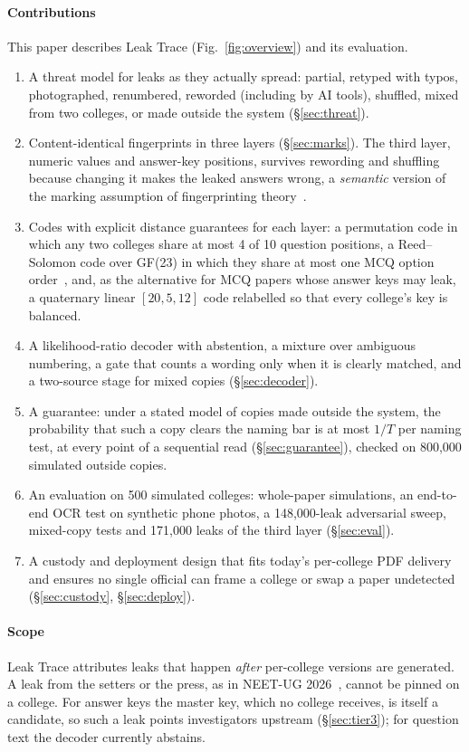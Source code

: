\documentclass[10pt,a4paper]{article}
\theoremstyle{remark}
\begin{document}
\paragraph{Contributions} This paper describes Leak Trace (Fig.~\ref{fig:overview}) and its evaluation.
\begin{enumerate}[label=(\arabic*)]
\item A threat model for leaks as they actually spread: partial, retyped with typos, photographed, renumbered, reworded (including by AI tools), shuffled, mixed from two colleges, or made outside the system (\S\ref{sec:threat}).
\item Content-identical fingerprints in three layers (\S\ref{sec:marks}). The third layer, numeric values and answer-key positions, survives rewording and shuffling because changing it makes the leaked answers wrong, a \emph{semantic} version of the marking assumption of fingerprinting theory~\citep{boneh1998}.
\item Codes with explicit distance guarantees for each layer: a permutation code in which any two colleges share at most 4 of 10 question positions, a Reed--Solomon code over GF(23) in which they share at most one MCQ option order~\citep{reed1960}, and, as the alternative for MCQ papers whose answer keys may leak, a quaternary linear $[20,5,12]$ code relabelled so that every college's key is balanced.
\item A likelihood-ratio decoder with abstention, a mixture over ambiguous numbering, a gate that counts a wording only when it is clearly matched, and a two-source stage for mixed copies (\S\ref{sec:decoder}).
\item A guarantee: under a stated model of copies made outside the system, the probability that such a copy clears the naming bar is at most $1/T$ per naming test, at every point of a sequential read (\S\ref{sec:guarantee}), checked on 800{,}000 simulated outside copies.
\item An evaluation on 500 simulated colleges: whole-paper simulations, an end-to-end OCR test on synthetic phone photos, a 148{,}000-leak adversarial sweep, mixed-copy tests and 171{,}000 leaks of the third layer (\S\ref{sec:eval}).
\item A custody and deployment design that fits today's per-college PDF delivery and ensures no single official can frame a college or swap a paper undetected (\S\ref{sec:custody}, \S\ref{sec:deploy}).
\end{enumerate}

\paragraph{Scope} Leak Trace attributes leaks that happen \emph{after} per-college versions are generated. A leak from the setters or the press, as in NEET-UG 2026~\citep{tribune2026cbi}, cannot be pinned on a college. For answer keys the master key, which no college receives, is itself a candidate, so such a leak points investigators upstream (\S\ref{sec:tier3}); for question text the decoder currently abstains.
\end{document}
